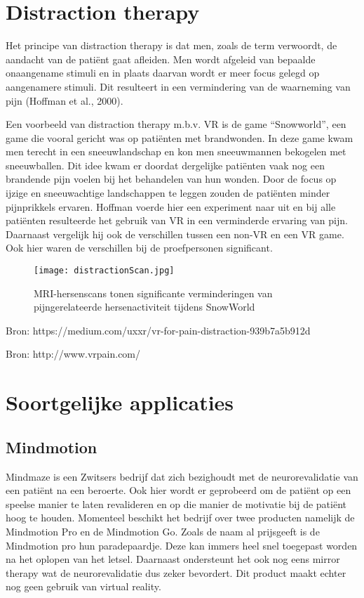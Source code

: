 \section{Distraction therapy}
Het principe van distraction therapy is dat men, zoals de term verwoordt, de aandacht van de patiënt gaat afleiden. Men wordt afgeleid van bepaalde onaangename stimuli en in plaats daarvan wordt er meer focus gelegd op aangenamere stimuli. Dit resulteert in een vermindering van de waarneming van pijn (Hoffman et al., 2000). 

Een voorbeeld van distraction therapy m.b.v. VR is de game “Snowworld”, een game die vooral gericht was op patiënten met brandwonden. In deze game kwam men terecht in een sneeuwlandschap en kon men sneeuwmannen bekogelen met sneeuwballen. Dit idee kwam er doordat dergelijke patiënten vaak nog een brandende pijn voelen bij het behandelen van hun wonden. Door de focus op ijzige en sneeuwachtige landschappen te leggen zouden de patiënten minder pijnprikkels ervaren.
Hoffman voerde hier een experiment naar uit en bij alle patiënten resulteerde het gebruik van VR in een verminderde ervaring van pijn. Daarnaast vergelijk hij ook de verschillen tussen een non-VR en een VR game. Ook hier waren de verschillen bij de proefpersonen significant.

\begin{figure}[h]
    \centering
    \texttt{[image: distractionScan.jpg]}
    \caption{MRI-hersenscans tonen significante verminderingen van pijngerelateerde hersenactiviteit tijdens SnowWorld}
\end{figure}

Bron: https://medium.com/uxxr/vr-for-pain-distraction-939b7a5b912d

Bron: http://www.vrpain.com/


\section{Soortgelijke applicaties}
\subsection{Mindmotion}
Mindmaze is een Zwitsers bedrijf dat zich bezighoudt met de neurorevalidatie van een patiënt na een beroerte. Ook hier wordt er geprobeerd om de patiënt op een speelse manier te laten revalideren en op die manier de motivatie bij de patiënt hoog te houden. Momenteel beschikt het bedrijf over twee producten namelijk de Mindmotion Pro en de Mindmotion Go. Zoals de naam al prijsgeeft is de Mindmotion pro hun paradepaardje. Deze kan immers heel snel toegepast worden na het oplopen van het letsel. Daarnaast ondersteunt het ook nog eens mirror therapy wat de neurorevalidatie dus zeker bevordert. Dit product maakt echter nog geen gebruik van virtual reality.

